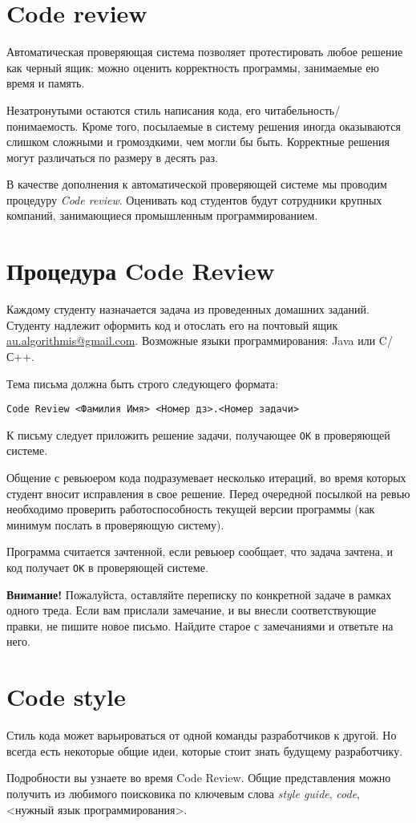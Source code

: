 \documentclass[12pt]{article}
\begin{document}
\section{Code review}

Автоматическая проверяющая система позволяет протестировать
любое решение как черный ящик: можно оценить корректность программы,
занимаемые ею время и память.

Незатронутыми остаются стиль написания кода, его читабельность/понимаемость.
Кроме того, посылаемые в систему решения иногда оказываются слишком
сложными и громоздкими, чем могли бы быть. Корректные решения могут различаться 
по размеру в десять раз.

В качестве дополнения к автоматической проверяющей системе мы проводим
процедуру \textit{Code review}. Оценивать код студентов будут сотрудники крупных
компаний, занимающиеся промышленным программированием.

\section{Процедура Code Review}

Каждому студенту назначается задача из проведенных
домашних заданий. Студенту надлежит оформить код
и отослать его на почтовый ящик \href{mailto:au.algorithmis@gmail.com}{au.algorithmis@gmail.com}.
Возможные языки программирования: Java или C/С++.

Тема письма должна быть строго следующего формата:
\begin{center}
\texttt{Code Review <Фамилия Имя> <Номер дз>.<Номер задачи>}
\end{center}
К письму следует приложить решение задачи, получающее \texttt{OK}
в проверяющей системе.

Общение с ревьюером кода подразумевает несколько итераций,
во время которых студент вносит исправления в свое решение.
Перед очередной посылкой на ревью необходимо
проверить работоспособность текущей версии программы 
(как минимум послать в проверяющую систему).

Программа считается зачтенной, если ревьюер сообщает,
что задача зачтена, и код получает \texttt{OK} в проверяющей системе.

\textbf{Внимание!} Пожалуйста, оставляйте переписку по конкретной
задаче в рамках одного треда. Если вам прислали замечание, и
вы внесли соответствующие правки, не пишите новое письмо.
Найдите старое с замечаниями и ответьте на него.

\section{Code style}

Стиль кода может варьироваться от одной команды разработчиков к другой.
Но всегда есть некоторые общие идеи, которые стоит знать будущему
разработчику.

Подробности вы узнаете во время Code Review. Общие представления
можно получить из любимого поисковика по ключевым слова 
\textit{style guide}, \textit{code}, <нужный язык программирования>.
\end{document}
